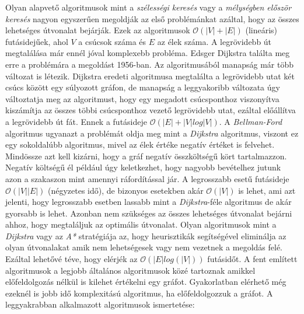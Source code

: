 \noindent Olyan alapvető algoritmusok mint a \textit{szélességi
keresés} vagy a \textit{mélységben először keresés} nagyon egyszerűen megoldják az első problémánkat azáltal, hogy az összes lehetséges útvonalat bejárják. Ezek az algoritmusok $\mathcal{O}(|V| + |E|)$ (lineáris) futásidejűek, ahol $V$ a csúcsok száma és $E$ az élek száma.
\newline
\newline A legrövidebb út megtalálása már ennél jóval komplexebb probléma. 
\newline
\newline Edsger Dijkstra találta meg erre a problémára a megoldást 1956-ban. Az algoritmusából manapság már több változat is létezik. Dijkstra eredeti algoritmusa megtalálta a legrövidebb utat két csúcs között egy súlyozott gráfon, de manapság a leggyakoribb változata úgy változtatja meg az algoritmust, hogy egy megadott csúcsponthoz viszonyítva kiszámítja az összes többi csúcsponthoz vezető legrövidebb utat, ezáltal előállítva a legrövidebb út fát. Ennek a futásideje $\mathcal{O}(|E| + |V| log|V|)$. 
\newline
\newline A \textit{Bellman-Ford} algoritmus ugyanazt a problémát oldja meg mint a \textit{Dijkstra} algoritmus, viszont ez egy sokoldalúbb algoritmus, mivel az élek értéke negatív értéket is felvehet. Mindössze azt kell kizárni, hogy a gráf negatív összköltségű kört tartalmazzon. Negatív költségű él például úgy keletkezhet, hogy nagyobb bevételhez jutunk azon a szakaszon mint amennyi ráfordítással jár. A legrosszabb esetű futásideje $\mathcal{O}(|V||E|)$ (négyzetes idő), de bizonyos esetekben akár $\mathcal{O}(|V|)$ is lehet, ami azt jelenti, hogy legrosszabb esetben lassabb mint a \textit{Dijkstra}-féle algoritmus de akár gyorsabb is lehet. 
\newline
\newline Azonban nem szükséges az összes lehetséges útvonalat bejárni ahhoz, hogy megtaláljuk az optimális útvonalat. Olyan algoritmusok mint a \textit{Dijkstra} vagy az \textit{A*} stratégiája az, hogy heurisztikák segítségével eliminálja az olyan útvonalakat amik nem lehetségesek vagy nem vezetnek a megoldás felé. Ezáltal lehetővé téve, hogy elérjék az $\mathcal{O}(|E| log(|V|))$ futásidőt. 
\newline
\newline A fent említett algoritmusok a legjobb általános algoritmusok közé tartoznak amikkel előfeldolgozás nélkül is kilehet értékelni egy gráfot. Gyakorlatban elérhető még ezeknél is jobb idő komplexitású algoritmus, ha előfeldolgozzuk a gráfot.
\newline
\newline A leggyakrabban alkalmazott algoritmusok ismertetése:

